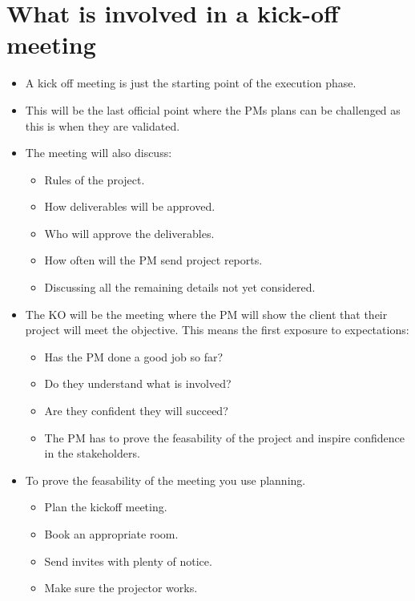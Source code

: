 \section{What is involved in a kick-off meeting}
\begin{itemize}
    \item A kick off meeting is just the starting point of the execution phase.
    \item This will be the last official point where the PMs plans can be challenged as this is when they are validated.
    \item The meeting will also discuss:
        \begin{itemize}
            \item Rules of the project.
            \item How deliverables will be approved.
            \item Who will approve the deliverables.
            \item How often will the PM send project reports.
            \item Discussing all the remaining details not yet considered.
        \end{itemize}
    
    \item The KO will be the meeting where the PM will show the client that their project will meet the objective. This means the first exposure to expectations:
        \begin{itemize}
            \item Has the PM done a good job so far?
            \item Do they understand what is involved?
            \item Are they confident they will succeed?
            \item The PM has to prove the feasability of the project and inspire confidence in the stakeholders.
        \end{itemize}
    
    \item To prove the feasability of the meeting you use planning.
        \begin{itemize}
            \item Plan the kickoff meeting.
            \item Book an appropriate room.
            \item Send invites with plenty of notice.
            \item Make sure the projector works.
        \end{itemize}
    

\end{itemize}
